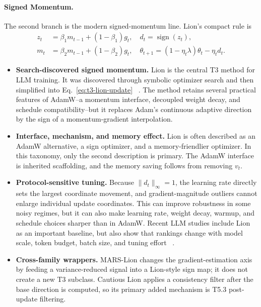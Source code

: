 \paragraph{Signed Momentum.}
\label{sec:t3-lion-line}

The second branch is the modern signed-momentum line.  Lion's compact rule is
\begin{align}
  z_t &= \beta_1 m_{t-1}+(1-\beta_1)g_t, \quad
  d_t = \operatorname{sign}(z_t), \\
  m_t &= \beta_2 m_{t-1}+(1-\beta_2)g_t, \quad
  \theta_{t+1} = (1-\eta_t\lambda)\theta_t-\eta_t d_t .
  \label{eq:t3-lion-update}
\end{align}
\begin{itemize}
  \setlength{\itemsep}{2pt}
  \item \textbf{Search-discovered signed momentum.}  Lion is the central T3
  method for LLM training.  It was discovered through symbolic optimizer
  search and then simplified into Eq.~\eqref{eq:t3-lion-update}
  ~\citep{chen2023symbolic}.  The method retains several practical features of
  AdamW--a momentum interface, decoupled weight decay, and schedule
  compatibility--but it replaces Adam's continuous adaptive direction by the
  sign of a momentum-gradient interpolation.
  \item \textbf{Interface, mechanism, and memory effect.}  Lion is often
  described as an AdamW alternative, a sign optimizer, and a memory-friendlier
  optimizer.  In this taxonomy, only the second description is primary.  The
  AdamW interface is inherited scaffolding, and the memory saving follows from
  removing $v_t$.
  \item \textbf{Protocol-sensitive tuning.}  Because $\|d_t\|_\infty=1$, the
  learning rate directly sets the largest coordinate movement, and
  gradient-magnitude outliers cannot enlarge individual update coordinates.
  This can improve robustness in some noisy regimes, but it can also make
  learning rate, weight decay, warmup, and schedule choices sharper than in
  AdamW.  Recent LLM studies include Lion as an important baseline, but also
  show that rankings change with model scale, token budget, batch size, and
  tuning effort
  ~\citep{zhao2025deconstructing,semenov2025benchmarking,wen2025fantastic,schlotthauer2025budget}.
  \item \textbf{Cross-family wrappers.}  MARS-Lion changes the
  gradient-estimation axis by feeding a variance-reduced signal into a
  Lion-style sign map; it does not create a new T3 subclass.  Cautious Lion
  applies a consistency filter after the base direction is computed, so its
  primary added mechanism is T5.3 post-update filtering.
\end{itemize}

